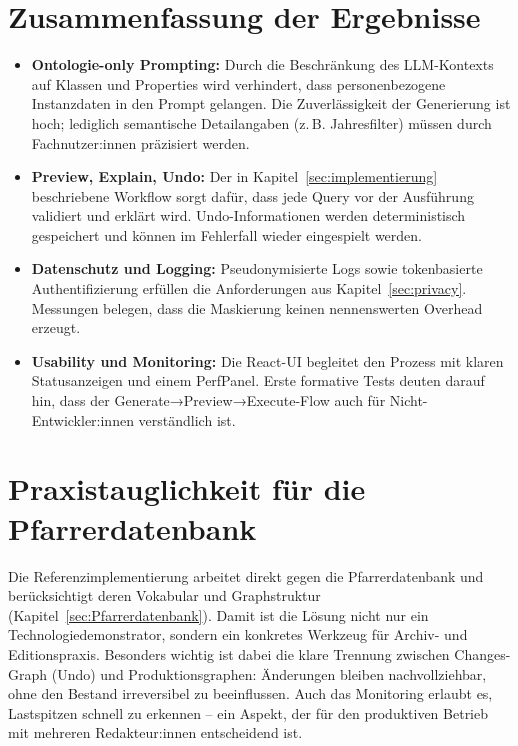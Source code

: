 \section{Zusammenfassung der Ergebnisse}
\begin{itemize}
  \item \textbf{Ontologie-only Prompting:} Durch die Beschränkung des LLM-Kontexts auf Klassen und Properties wird verhindert, dass personenbezogene Instanzdaten in den Prompt gelangen. Die Zuverlässigkeit der Generierung ist hoch; lediglich semantische Detailangaben (z.\,B. Jahresfilter) müssen durch Fachnutzer:innen präzisiert werden.
  \item \textbf{Preview, Explain, Undo:} Der in Kapitel~\ref{sec:implementierung} beschriebene Workflow sorgt dafür, dass jede Query vor der Ausführung validiert und erklärt wird. Undo-Informationen werden deterministisch gespeichert und können im Fehlerfall wieder eingespielt werden.
  \item \textbf{Datenschutz und Logging:} Pseudonymisierte Logs sowie tokenbasierte Authentifizierung erfüllen die Anforderungen aus Kapitel~\ref{sec:privacy}. Messungen belegen, dass die Maskierung keinen nennenswerten Overhead erzeugt.
  \item \textbf{Usability und Monitoring:} Die React-UI begleitet den Prozess mit klaren Statusanzeigen und einem PerfPanel. Erste formative Tests deuten darauf hin, dass der Generate→Preview→Execute-Flow auch für Nicht-Entwickler:innen verständlich ist.
\end{itemize}

\section{Praxistauglichkeit für die Pfarrerdatenbank}
Die Referenzimplementierung arbeitet direkt gegen die Pfarrerdatenbank und berücksichtigt deren Vokabular und Graphstruktur (Kapitel~\ref{sec:Pfarrerdatenbank}). Damit ist die Lösung nicht nur ein Technologiedemonstrator, sondern ein konkretes Werkzeug für Archiv- und Editionspraxis. Besonders wichtig ist dabei die klare Trennung zwischen Changes-Graph (Undo) und Produktionsgraphen: Änderungen bleiben nachvollziehbar, ohne den Bestand irreversibel zu beeinflussen. Auch das Monitoring erlaubt es, Lastspitzen schnell zu erkennen – ein Aspekt, der für den produktiven Betrieb mit mehreren Redakteur:innen entscheidend ist.

